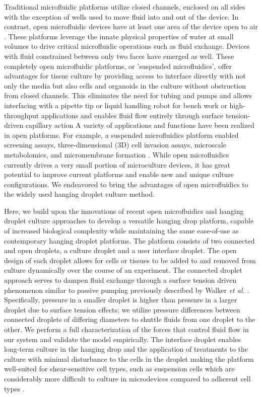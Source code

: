 Traditional microfluidic platforms utilize closed channels, enclosed on all sides with the exception of wells used to move fluid into and out of the device. In contrast, open microfluidic devices have at least one area of the device open to air \cite{Kaigala2012, Zimmermann2005a, Walker2002}. These platforms leverage the innate physical properties of water at small volumes to drive critical microfluidic operations such as fluid exchange. Devices with fluid constrained between only two faces have emerged as well. These completely open microfluidic platforms, or 'suspended microfluidics', offer advantages for tissue culture by providing access to interface directly with not only the media but also cells and organoids in the culture without obstruction from closed channels. This eliminates the need for tubing and pumps and allows interfacing with a pipette tip or liquid handling robot for bench work or high-throughput applications and enables fluid flow entirely through surface tension-driven capillary action A variety of applications and functions have been realized in open platforms. For example, a suspended microfluidics platform enabled screening assays, three-dimensional (3D) cell invasion assays, microscale metabolomics, and micromembrane formation \cite{Casavant2013}. While open microfluidics currently drives a very small portion of microculture devices, it has great potential to improve current platforms and enable new and unique culture configurations. We endeavored to bring the advantages of open microfluidics to the widely used hanging droplet culture method.

Here, we build upon the innovations of recent open microfluidics and hanging droplet culture approaches to develop a versatile hanging drop platform, capable of increased biological complexity while maintaining the same ease-of-use as contemporary hanging droplet platforms. The platform consists of two connected and open droplets, a culture droplet and a user interface droplet. The open design of each droplet allows for cells or tissues to be added to and removed from culture dynamically over the course of an experiment. The connected droplet approach serves to dampen fluid exchange through a surface tension driven phenomenon similar to passive pumping previously described by Walker \textit{et al.}  \cite{Beebe2002a}.  Specifically, pressure in a smaller droplet is higher than pressure in a larger droplet due to surface tension effects; we utilize pressure differences between connected droplets of differing diameters to shuttle fluids from one droplet to the other.  We perform a full characterization of the forces that control fluid flow in our system and validate the model empirically. The interface droplet enables long-term culture in the hanging drop and the application of treatments to the culture with minimal disturbance to the cells in the droplet making the platform well-suited for shear-sensitive cell types, such as suspension cells which are considerably more difficult to culture in microdevices compared to adherent cell types \cite{Young2012}. 

